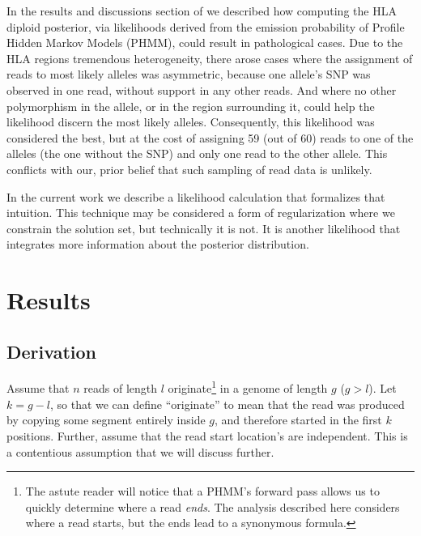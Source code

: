 In the results and discussions section of \cite{Prohlatype} we described how
computing the HLA diploid posterior,
via likelihoods derived from the emission probability of Profile Hidden Markov Models (PHMM),
could result in pathological cases.
Due to the HLA regions tremendous heterogeneity,
there arose cases where the assignment of reads to most likely alleles was asymmetric,
because one allele's SNP was observed in one read,
without support in any other reads.
And where no other polymorphism in the allele, or in the region surrounding it,
could help the likelihood discern the most likely alleles.
Consequently, this likelihood was considered the best, but at the cost of assigning 59 (out of 60)
reads to one of the alleles (the one without the SNP) and only one read to the other allele.
This conflicts with our, prior belief that such sampling of read data is unlikely.

In the current work we describe a likelihood calculation that formalizes that intuition.
This technique may be considered a form of regularization\cite{TODO} where we
constrain the solution set, but technically it is not.
It is another likelihood that integrates more information about the posterior
distribution.

\section{Results}

\subsection{Derivation}
Assume that $n$ reads of length $l$ originate\footnote{The astute reader will
notice that a PHMM's forward pass allows us to quickly determine where a read
\emph{ends}. The analysis described here considers where a read starts, but the
ends lead to a synonymous formula.}
in a genome of length $g$ ($g>l$).
Let $k=g-l$, so that we can define ``originate'' to mean that the read was produced
by copying some segment entirely inside $g$,
and therefore started in the first $k$ positions.
Further, assume that the read start location's are independent.
This is a contentious assumption that we will discuss further.

